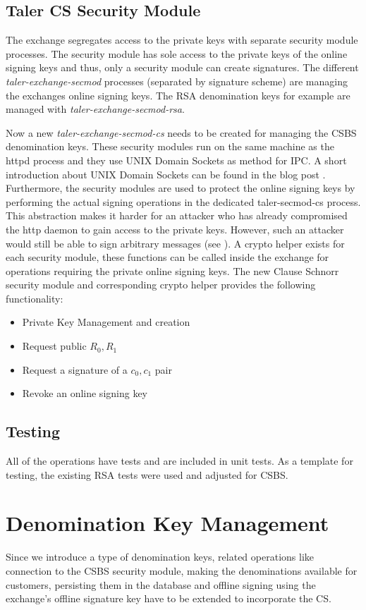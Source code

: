 \subsection{Taler CS Security Module}
The exchange segregates access to the private keys with separate security module processes.
The security module has sole access to the private keys of the online signing keys and thus, only a security module can create signatures.
The different \textit{taler-exchange-secmod} processes (separated by signature scheme) are managing the exchanges online signing keys. The RSA denomination keys for example are managed with \textit{taler-exchange-secmod-rsa}.

Now a new \textit{taler-exchange-secmod-cs} needs to be created for managing the \gls{CSBS} denomination keys.
These security modules run on the same machine as the httpd process and they use UNIX Domain Sockets as method for \acl{IPC}.
A short introduction about UNIX Domain Sockets can be found in the blog post \cite{matt:unix-domain-sockets}.
Furthermore, the security modules are used to protect the online signing keys by performing the actual signing operations in the dedicated taler-secmod-cs process.
This abstraction makes it harder for an attacker who has already compromised the http daemon to gain access to the private keys.
However, such an attacker would still be able to sign arbitrary messages (see \cite{taler-documentation:exchange-operator-manual}).
A crypto helper exists for each security module, these functions can be called inside the exchange for operations requiring the private online signing keys.
The new Clause Schnorr security module and corresponding crypto helper provides the following functionality:
\begin{itemize}
  \item Private Key Management and creation
  \item Request public $R_0, R_1$
  \item Request a signature of a $c_0,c_1$ pair
  \item Revoke an online signing key
\end{itemize}

\subsection{Testing}
All of the operations have tests and are included in unit tests.
As a template for testing, the existing RSA tests were used and adjusted for \gls{CSBS}.


\section{Denomination Key Management}
Since we introduce a type of denomination keys, related operations like connection to the \gls{CSBS} security module, making the denominations available for customers, persisting them in the database and offline signing using the exchange's offline signature key have to be extended to incorporate the \acl{CS}.

